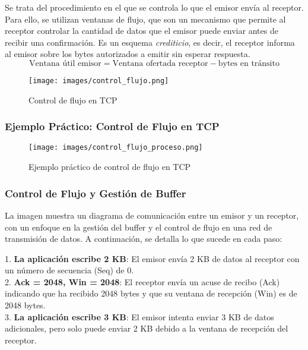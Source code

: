 \documentclass[a4paper,12pt]{article}
\begin{document}
Se trata del procedimiento en el que se controla lo que el emisor envía al receptor. Para ello, se utilizan ventanas de flujo, que son un mecanismo que permite al receptor controlar la cantidad de datos que el emisor puede enviar antes de recibir una confirmación. Es un esquema \textit{crediticio}, es decir, el receptor informa al emisor sobre los bytes autorizados a emitir sin esperar respuesta. 
\begin{equation}
    \text{Ventana útil emisor} = \text{Ventana ofertada receptor} - \text{bytes en tránsito}
\end{equation}

\begin{figure}[H]
    \centering
    \texttt{[image: images/control\_flujo.png]}
    \caption{Control de flujo en TCP}
\end{figure}

\subsubsection{Ejemplo Práctico: Control de Flujo en TCP}

\begin{figure}[H]
    \centering
    \texttt{[image: images/control\_flujo\_proceso.png]}
    \caption{Ejemplo práctico de control de flujo en TCP}
\end{figure}

\subsubsection*{Control de Flujo y Gestión de Buffer}

La imagen muestra un diagrama de comunicación entre un emisor y un receptor, con un enfoque en la gestión del buffer y el control de flujo en una red de transmisión de datos. A continuación, se detalla lo que sucede en cada paso:

1. \textbf{La aplicación escribe 2 KB}: El emisor envía 2 KB de datos al receptor con un número de secuencia (Seq) de 0.\\

2. \textbf{Ack = 2048, Win = 2048}: El receptor envía un acuse de recibo (Ack) indicando que ha recibido 2048 bytes y que su ventana de recepción (Win) es de 2048 bytes.\\

3. \textbf{La aplicación escribe 3 KB}: El emisor intenta enviar 3 KB de datos adicionales, pero solo puede enviar 2 KB debido a la ventana de recepción del receptor.\\
\end{document}
